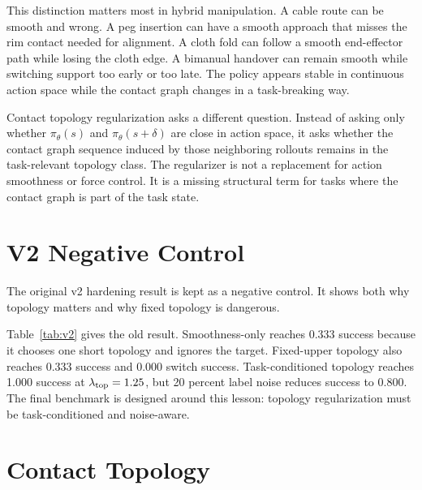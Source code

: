 \documentclass{article}
\newcommand{\pol}{\pi_\theta}
\begin{document}
This distinction matters most in hybrid manipulation. A cable route can be smooth and wrong. A peg insertion can have a smooth approach that misses the rim contact needed for alignment. A cloth fold can follow a smooth end-effector path while losing the cloth edge. A bimanual handover can remain smooth while switching support too early or too late. The policy appears stable in continuous action space while the contact graph changes in a task-breaking way.

Contact topology regularization asks a different question. Instead of asking only whether $\pol(s)$ and $\pol(s+\delta)$ are close in action space, it asks whether the contact graph sequence induced by those neighboring rollouts remains in the task-relevant topology class. The regularizer is not a replacement for action smoothness or force control. It is a missing structural term for tasks where the contact graph is part of the task state.

\section{V2 Negative Control}

The original v2 hardening result is kept as a negative control. It shows both why topology matters and why fixed topology is dangerous.

\begin{table}[t]
\centering
\small
\resizebox{\linewidth}{!}{}
\caption{V2 topology-switch stress over upper, lower, and switching toy topology targets. Fixed topology regularization fails switching tasks, while task-conditioned topology succeeds only when the topology weight is large enough and labels are reliable.}
\label{tab:v2}
\end{table}

Table~\ref{tab:v2} gives the old result. Smoothness-only reaches 0.333 success because it chooses one short topology and ignores the target. Fixed-upper topology also reaches 0.333 success and 0.000 switch success. Task-conditioned topology reaches 1.000 success at $\lambda_{\rm top}=1.25$, but 20 percent label noise reduces success to 0.800. The final benchmark is designed around this lesson: topology regularization must be task-conditioned and noise-aware.

\section{Contact Topology}
\end{document}
